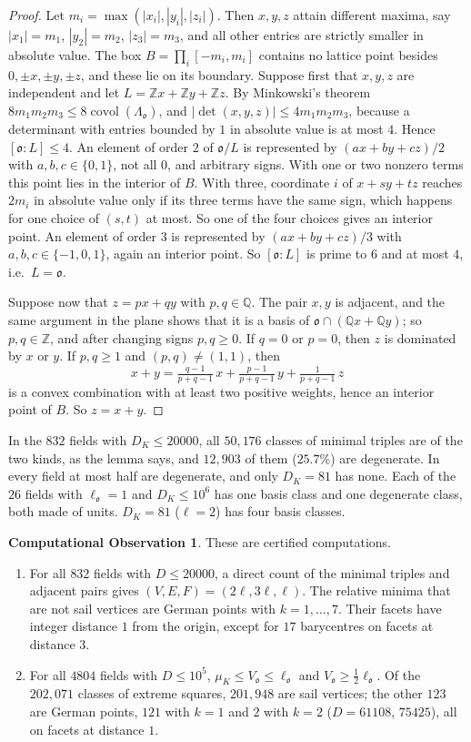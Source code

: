 \documentclass[11pt,reqno]{amsart}
\theoremstyle{plain}
\theoremstyle{definition}
\newtheorem{observation}[theorem]{Computational Observation}
\newcommand{\Z}{\mathbb{Z}}
\newcommand{\Q}{\mathbb{Q}}
\newcommand{\Ok}{\mathfrak{o}}
\newcommand{\muK}{\mu_K}
\begin{document}
\begin{proof}
Let $m_i=\max(|x_i|,|y_i|,|z_i|)$. Then $x,y,z$ attain different maxima, say $|x_1|=m_1$, $|y_2|=m_2$,
$|z_3|=m_3$, and all other entries are strictly smaller in absolute value. The box
$B=\prod_i[-m_i,m_i]$ contains no lattice point besides $0,\pm x,\pm y,\pm z$, and these lie on its
boundary. Suppose first that $x,y,z$ are independent and let $L=\Z x+\Z y+\Z z$. By Minkowski's theorem
$8m_1m_2m_3\le8\operatorname{covol}(\Lambda_\Ok)$, and $|\det(x,y,z)|\le4m_1m_2m_3$, because a determinant
with entries bounded by $1$ in absolute value is at most $4$. Hence $[\Ok:L]\le4$. An element of order $2$ of
$\Ok/L$ is represented by $(ax+by+cz)/2$ with $a,b,c\in\{0,1\}$, not all $0$, and arbitrary signs. With one or
two nonzero terms this point lies in the interior of $B$. With three, coordinate $i$ of $x+sy+tz$ reaches
$2m_i$ in absolute value only if its three terms have the same sign, which happens for one choice of
$(s,t)$ at most. So one of the four choices gives an interior point. An element of order $3$ is
represented by $(ax+by+cz)/3$ with $a,b,c\in\{-1,0,1\}$, again an interior point. So $[\Ok:L]$ is prime to $6$
and at most $4$, i.e.\ $L=\Ok$.

Suppose now that $z=px+qy$ with $p,q\in\Q$. The pair $x,y$ is adjacent, and the same argument in the plane
shows that it is a basis of $\Ok\cap(\Q x+\Q y)$; so $p,q\in\Z$, and after changing signs $p,q\ge0$. If $q=0$
or $p=0$, then $z$ is dominated by $x$ or $y$. If $p,q\ge1$ and $(p,q)\ne(1,1)$, then
\[
x+y=\tfrac{q-1}{p+q-1}\,x+\tfrac{p-1}{p+q-1}\,y+\tfrac1{p+q-1}\,z
\]
is a convex combination with at least two positive weights, hence an interior point of $B$. So $z=x+y$.
\end{proof}

In the $832$ fields with $D_K\le20000$, all $50{,}176$ classes of minimal triples are of the two kinds, as the
lemma says, and $12{,}903$ of them ($25.7\%$) are degenerate. In every field at most half are degenerate, and
only $D_K=81$ has none. Each of the $26$ fields with $\ell_\Ok=1$ and $D_K\le10^6$ has one basis class and one
degenerate class, both made of units. $D_K=81$ ($\ell=2$) has four basis classes.

\begin{observation}\label{obs:sails}
These are certified computations.
\begin{enumerate}[label=\textup{(\alph*)},leftmargin=2.2em]
\item For all $832$ fields with $D\le20000$, a direct count of the minimal triples and adjacent pairs gives
$(V,E,F)=(2\ell,3\ell,\ell)$. The relative minima that are not sail vertices are German points with
$k=1,\dots,7$. Their facets have integer distance $1$ from the origin, except for $17$ barycentres on
facets at distance $3$.
\item For all $4804$ fields with $D\le10^5$, $\muK\le V_\Ok\le\ell_\Ok$ and $V_\Ok\ge\tfrac12\ell_\Ok$. Of the
$202{,}071$ classes of extreme squares, $201{,}948$ are sail vertices; the other $123$ are German points, $121$
with $k=1$ and $2$ with $k=2$ \textup{(}$D=61108$, $75425$\textup{)}, all on facets at distance $1$.
\end{enumerate}
\end{observation}
\end{document}
